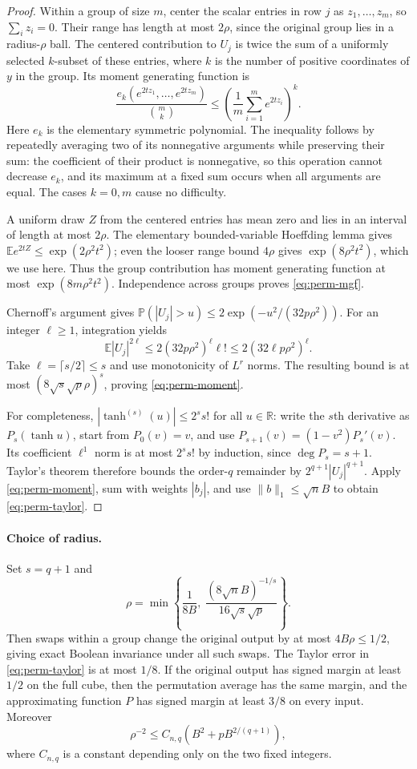 \begin{proof}
Within a group of size $m$, center the scalar entries in row $j$ as
$z_1,\ldots,z_m$, so $\sum_i z_i=0$. Their range has length at most
$2\rho$, since the original group lies in a radius-$\rho$ ball.
The centered contribution to $U_j$ is twice the sum of a uniformly
selected $k$-subset of these entries, where $k$ is the number of positive
coordinates of $y$ in the group. Its moment generating function is
\[
 \frac{e_k(e^{2tz_1},\ldots,e^{2tz_m})}{\binom mk}
 \le\left(\frac1m\sum_{i=1}^m e^{2tz_i}\right)^k.
\]
Here $e_k$ is the elementary symmetric polynomial. The inequality follows
by repeatedly averaging two of its nonnegative arguments while preserving
their sum: the coefficient of their product is nonnegative, so this
operation cannot decrease $e_k$, and its maximum at a fixed sum occurs
when all arguments are equal. The cases $k=0,m$ cause no difficulty.

A uniform draw $Z$ from the centered entries has mean zero and lies in an
interval of length at most $2\rho$. The elementary bounded-variable
Hoeffding lemma gives $\mathbb E e^{2tZ}\le\exp(2\rho^2t^2)$; even the
looser range bound $4\rho$ gives $\exp(8\rho^2t^2)$, which we use here.
Thus the group contribution has moment generating function at most
$\exp(8m\rho^2t^2)$. Independence across groups proves
\eqref{eq:perm-mgf}.

Chernoff's argument gives
$\mathbb P(|U_j|>u)\le2\exp(-u^2/(32p\rho^2))$.
For an integer $\ell\ge1$, integration yields
\[
 \mathbb E|U_j|^{2\ell}\le2(32p\rho^2)^\ell\ell!
 \le2(32\ell p\rho^2)^\ell.
\]
Take $\ell=\lceil s/2\rceil\le s$ and use monotonicity of $L^r$ norms.
The resulting bound is at most $(8\sqrt s\sqrt p\rho)^s$, proving
\eqref{eq:perm-moment}.

For completeness, $|\tanh^{(s)}(u)|\le2^s s!$ for all $u\in\mathbb R$:
write the $s$th derivative as $P_s(\tanh u)$, start from $P_0(v)=v$,
and use $P_{s+1}(v)=(1-v^2)P_s'(v)$. Its coefficient $\ell^1$ norm
is at most $2^s s!$ by induction, since $\deg P_s=s+1$.
Taylor's theorem therefore bounds the order-$q$ remainder by
$2^{q+1}|U_j|^{q+1}$. Apply \eqref{eq:perm-moment}, sum with
weights $|b_j|$, and use $\|b\|_1\le\sqrt n B$ to obtain
\eqref{eq:perm-taylor}.
\end{proof}

\paragraph{Choice of radius.}
Set $s=q+1$ and
\[
 \rho=\min\left\{\frac1{8B},\;
      \frac{(8\sqrt n B)^{-1/s}}{16\sqrt{s}\sqrt p}\right\}.
\]
Then swaps within a group change the original output by at most
$4B\rho\le1/2$, giving exact Boolean invariance under all such swaps.
The Taylor error in \eqref{eq:perm-taylor} is at most $1/8$.
If the original output has signed margin at least $1/2$ on the full cube,
then the permutation average has the same margin, and the approximating
function $P$ has signed margin at least $3/8$ on every input.
Moreover
\[
 \rho^{-2}\le C_{n,q}\left(B^2+pB^{2/(q+1)}\right),
\]
where $C_{n,q}$ is a constant depending only on the two fixed integers.
